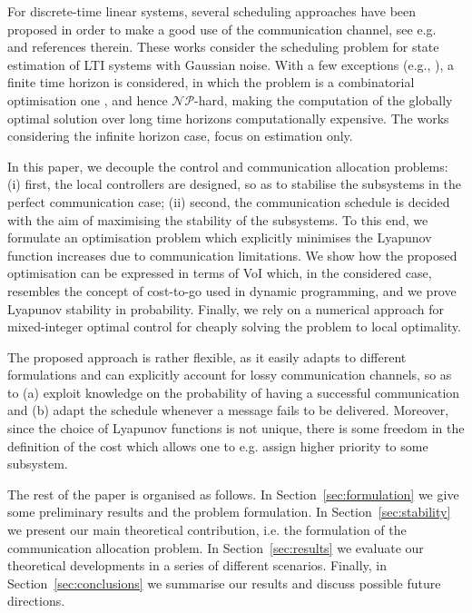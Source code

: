 \documentclass[letterpaper, 10 pt, conference]{ieeeconf}  %
\begin{document}
For discrete-time linear systems, several scheduling approaches have been proposed in order to make a good use of the communication channel, see e.g.~\cite{Molin2015,Mamduhi2015,Soleymani2016} and references therein. These works
consider the scheduling problem for state estimation of LTI systems with Gaussian noise. With a few exceptions (e.g., \cite{Tomlin2014,Sinopoli2014}), a finite time horizon is considered, in which the problem is a combinatorial optimisation one \cite{Vitus2012}, and hence $\mathcal{NP}$-hard, making the computation of the globally optimal solution over long time horizons computationally expensive.
The works considering the infinite horizon case, focus on estimation only. %

In this paper, we decouple the control and communication allocation problems: (i) first, the local controllers are designed, so as to stabilise the subsystems in the perfect communication case; (ii) second, the communication schedule is decided with the aim of maximising the stability of the subsystems. To this end, we formulate an optimisation problem which explicitly minimises the Lyapunov function increases due to communication limitations. We show how the proposed optimisation can be expressed in terms of VoI which, in the considered case, resembles the concept of cost-to-go used in dynamic programming, and we prove Lyapunov stability in probability. Finally, we rely on a numerical approach for mixed-integer optimal control for cheaply solving the problem to local optimality.

The proposed approach is rather flexible, as it easily adapts to different formulations and can explicitly account for lossy communication channels, so as to (a) exploit knowledge on the probability of having a successful communication and (b) adapt the schedule whenever a message fails to be delivered. Moreover,
since the choice of Lyapunov functions is not unique, there is some freedom in the definition of the cost which allows one to e.g. assign higher priority to some subsystem.

The rest of the paper is organised as follows. In Section~\ref{sec:formulation} we give some preliminary results and the problem formulation. In Section~\ref{sec:stability} we present our main theoretical contribution, i.e. the formulation of the communication allocation problem. 
In Section~\ref{sec:results} we evaluate our theoretical developments in a series of different scenarios. Finally, in Section~\ref{sec:conclusions} we summarise our results and discuss possible future directions.
\end{document}
